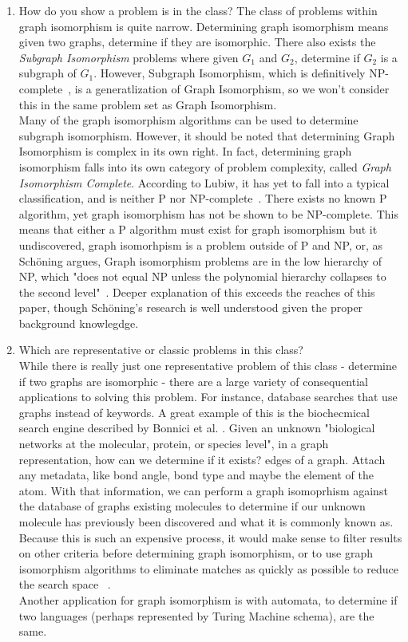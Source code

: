 \documentclass[letterpaper, 12pt]{article}
\begin{document}
\begin{enumerate}
    \item How do you show a problem is in the class?
    The class of problems within graph isomorphism is quite narrow. Determining graph isomorphism
    means given two graphs, determine if they are isomorphic. There also exists the \textit{Subgraph Isomorphism} problems
    where given $G_1$ and $G_2$,
    determine if $G_2$ is a subgraph of $G_1$. However, Subgraph Isomorphism, which is definitively NP-complete~\cite{cook1971complexity},
    is a generatlization of Graph Isomorphism, so we won't consider this in the same problem set as Graph Isomorphism.
    \\
    Many of the graph isomorphism algorithms
    can be used to determine subgraph isomorphism. However, it should be noted that determining
    Graph Isomorphism is complex in its own right. In fact, determining graph isomorphism falls
    into its own category of problem complexity, called \textit{Graph Isomorphism Complete}.
    According to Lubiw, it has yet to fall into a typical classification, and is neither P nor NP-complete~\cite{anna-complexity}.
    There exists no known P algorithm, yet graph isomorphism has not be shown to be NP-complete. This means that either a P algorithm
    must exist for graph isomorphism but it undiscovered, graph isomorhpism is a problem outside of
    P and NP, or, as Schöning argues, Graph isomorphism problems are in the low hierarchy of NP,
    which "does not equal NP unless the polynomial hierarchy collapses to the second level"~\cite{np-hierarchy}.
    Deeper explanation of this exceeds the reaches of this paper, though Schöning's research is well
    understood given the proper background knowlegdge.

    \item Which are representative or classic problems in this class?
    \\
    While there is really just one representative problem of this class - determine if two graphs are isomorphic -
    there are a large variety of consequential applications to solving this problem. For instance,
    database searches that use graphs instead of keywords. A great example of this is the biochecmical search
    engine described by Bonnici et al. . Given an unknown "biological networks at the molecular, protein, or species level",
    in a graph representation, how can we determine if it exists?
    edges of a graph. Attach any metadata, like bond angle, bond type and maybe the element of the atom.
    With that information, we can perform a graph isomoprhism against the database of graphs existing molecules
    to determine if our unknown molecule has previously been discovered and what it is commonly known as.
    Because this is such an expensive process, it would make sense to filter results on other criteria
    before determining graph isomorphism, or to use graph isomorphism algorithms to eliminate matches
    as quickly as possible to reduce the search space ~\cite{Bonnici2013}.
    \\
    Another application for graph isomorphism is with automata, to determine if two languages
    (perhaps represented by Turing Machine schema), are the same.


\end{enumerate}
\end{document}
